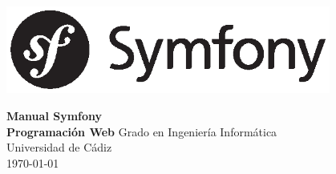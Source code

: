 \begin{titlepage}
    \includegraphics[width=0.8\textwidth]{../assets/symfony_logo.eps}
    \begin{center}
        \vspace*{5cm}
        \textbf{\Huge{Manual Symfony}}\\
        \vspace{0.5cm}
        \textbf{\huge{Programación Web}}
        \vspace{2cm}
        \vfill
        \Large{Grado en Ingeniería Informática}\\
        Universidad de Cádiz\\
        \today
        \vspace{2cm}

    \end{center}
\end{titlepage}